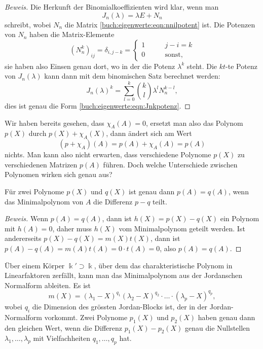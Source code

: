 \begin{proof}[Beweis]
Die Herkunft der Binomialkoeffizienten wird klar, wenn man
\[
J_n(\lambda) = \lambda E + N_n
\]
schreibt, wobei $N_n$ die Matrix \eqref{buch:eigenwerte:eqn:nnilpotent} ist.
Die Potenzen von $N_n$ haben die Matrix-Elemente
\[
(N_n^k)_{i\!j}
=
\delta_{i,j-k}
=
\begin{cases}
1&\qquad j-i=k\\
0&\qquad\text{sonst,}
\end{cases}
\]
sie haben also Einsen genau dort, wo in der
\label{buch:eigenwerte:eqn:Jnkpotenz} die Potenz $\lambda^{k}$ steht.
Die $kt$-te Potenz von $J_n(\lambda)$ kann dann mit dem binomischen
Satz berechnet werden:
\[
J_n(\lambda)^k
=
\sum_{l=0}^k \binom{k}{l}\lambda^l N_n^{k-l},
\]
dies ist genau die Form \eqref{buch:eigenwerte:eqn:Jnkpotenz}.
\end{proof}

Wir haben bereits gesehen, dass $\chi_A(A)=0$, ersetzt man also das
Polynom $p(X)$ durch $p(X)+\chi_A(X)$, dann ändert sich am Wert 
\[
(p+\chi_A)(A)
=
p(A) + \chi_A(A)
=
p(A)
\]
nichts.
Man kann also nicht erwarten, dass verschiedene Polynome 
$p(X)$ zu verschiedenen Matrizen $p(A)$ führen.
Doch welche Unterschiede zwischen Polynomen wirken sich genau aus?

\begin{satz}
Für zwei Polynome $p(X)$ und $q(X)$ ist genau dann $p(A)=q(A)$, wenn
das Minimalpolynom von $A$ die Differenz $p-q$ teilt.
\end{satz}

\begin{proof}[Beweis]
Wenn $p(A)=q(A)$, dann ist $h(X)=p(X)-q(X)$ ein Polynom mit $h(A)=0$,
daher muss $h(X)$ vom Minimalpolynom geteilt werden.
Ist andererseits $p(X)-q(X)=m(X)t(X)$, dann ist
$p(A)-q(A)=m(A)t(A)=0\cdot t(A) = 0$, also $p(A)=q(A)$.
\end{proof}

Über einem Körper $\Bbbk'\supset\Bbbk$, über dem das charakteristische
Polynom in Linearfaktoren zerfällt, kann man das Minimalpolynom aus
der Jordanschen Normalform ableiten.
Es ist
\[
m(X)
=
(\lambda_1-X)^{q_1}
(\lambda_2-X)^{q_2}
\cdot\ldots
\cdot
(\lambda_p-X)^{q_p},
\]
wobei $q_i$ die Dimension des grössten Jordan-Blocks ist, der in der
Jordan-Normalform vorkommt.
Zwei Polynome $p_1(X)$ und $p_2(X)$ haben genau dann den gleichen Wert,
wenn die Differenz $p_1(X)-p_2(X)$ genau die Nullstellen
$\lambda_1,\dots,\lambda_p$ mit Vielfachheiten $q_1,\dots,q_p$ hat.


